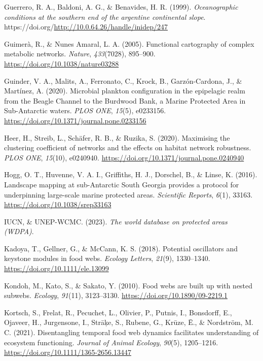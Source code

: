 \documentclass[preprint, 3p,
authoryear]{elsarticle} %
\newlength{\cslhangindent}
\newlength{\cslentryspacingunit} %
\newenvironment{CSLReferences}[2] %
 {%
  \setlength{\parindent}{0pt}
  \ifodd #1
  \let\oldpar\par
  \def\par{\hangindent=\cslhangindent\oldpar}
  \fi
  \setlength{\parskip}{#2\cslentryspacingunit}
 }%
 {}
\begin{document}
\begin{CSLReferences}{1}{0}
\leavevmode{}%
Guerrero, R. A., Baldoni, A. G., \& Benavides, H. R. (1999).
\emph{Oceanographic conditions at the southern end of the argentine
continental slope}.
https://doi.org/\url{http://10.0.64.26/handle/inidep/247}

\leavevmode{}%
Guimerà, R., \& Nunes Amaral, L. A. (2005). Functional cartography of
complex metabolic networks. \emph{Nature}, \emph{433}(7028), 895--900.
\url{https://doi.org/10.1038/nature03288}

\leavevmode{}%
Guinder, V. A., Malits, A., Ferronato, C., Krock, B., Garzón-Cardona,
J., \& Martínez, A. (2020). Microbial plankton configuration in the
epipelagic realm from the {Beagle Channel} to the {Burdwood Bank}, a
{Marine Protected Area} in {Sub-Antarctic} waters. \emph{PLOS ONE},
\emph{15}(5), e0233156.
\url{https://doi.org/10.1371/journal.pone.0233156}

\leavevmode{}%
Heer, H., Streib, L., Schäfer, R. B., \& Ruzika, S. (2020). Maximising
the clustering coefficient of networks and the effects on habitat
network robustness. \emph{PLOS ONE}, \emph{15}(10), e0240940.
\url{https://doi.org/10.1371/journal.pone.0240940}

\leavevmode{}%
Hogg, O. T., Huvenne, V. A. I., Griffiths, H. J., Dorschel, B., \&
Linse, K. (2016). Landscape mapping at sub-{Antarctic South Georgia}
provides a protocol for underpinning large-scale marine protected areas.
\emph{Scientific Reports}, \emph{6}(1), 33163.
\url{https://doi.org/10.1038/srep33163}

\leavevmode{}%
IUCN, \& UNEP-WCMC. (2023). \emph{The world database on protected areas
({WDPA})}.

\leavevmode{}%
Kadoya, T., Gellner, G., \& McCann, K. S. (2018). Potential oscillators
and keystone modules in food webs. \emph{Ecology Letters}, \emph{21}(9),
1330--1340. \url{https://doi.org/10.1111/ele.13099}

\leavevmode{}%
Kondoh, M., Kato, S., \& Sakato, Y. (2010). Food webs are built up with
nested subwebs. \emph{Ecology}, \emph{91}(11), 3123--3130.
\url{https://doi.org/10.1890/09-2219.1}

\leavevmode{}%
Kortsch, S., Frelat, R., Pecuchet, L., Olivier, P., Putnis, I.,
Bonsdorff, E., Ojaveer, H., Jurgensone, I., Strāķe, S., Rubene, G.,
Krūze, Ē., \& Nordström, M. C. (2021). Disentangling temporal food web
dynamics facilitates understanding of ecosystem functioning.
\emph{Journal of Animal Ecology}, \emph{90}(5), 1205--1216.
\url{https://doi.org/10.1111/1365-2656.13447}


\end{CSLReferences}
\end{document}

